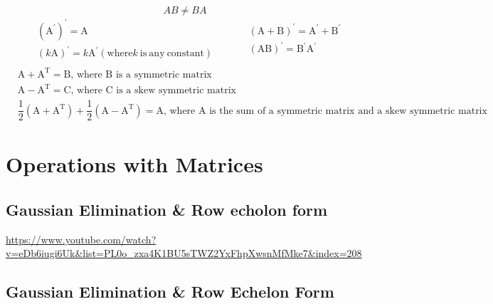 \documentclass[openany]{book}
\begin{document}
\begin{equation*}
	AB\neq BA    
\end{equation*}
\begin{equation*}
	\begin{split}
		&(\mathrm{A}^{\prime})^{\prime}=\mathrm{A}\\
		&(k\mathrm{A})^{\prime}=k\mathrm{A}^{\prime} (\mathrm{where} k\mathrm{~is~any~constant})\\
	\end{split}
	\quad \quad
	\begin{split}
		&(\mathrm{A}+\mathrm{B})^{\prime}=\mathrm{A}^{\prime}+\mathrm{B}^{\prime}\\
		&(\mathrm{A}\mathrm{B})^{\prime}=\mathrm{B}^{\prime} \mathrm{A}^{\prime}\\
	\end{split}
\end{equation*}
\begin{align*}
	 & \mathrm{A}+\mathrm{A}^\mathrm{T}=\mathrm{B}\text{, where \(\mathrm{B}\) is a symmetric matrix}                                                                                                     \\
	 & \mathrm{A}-\mathrm{A}^\mathrm{T}=\mathrm{C}\text{, where \(\mathrm{C}\) is a skew symmetric matrix}                                                                                                \\
	 & \dfrac{1}{2}(\mathrm{A}+\mathrm{A}^\mathrm{T})+\dfrac{1}{2}(\mathrm{A}-\mathrm{A}^\mathrm{T})=\mathrm{A}\text{, where \(\mathrm{A}\) is the sum of a symmetric matrix and a skew symmetric matrix}
\end{align*}

\section{Operations with Matrices}

\subsection{Gaussian Elimination \& Row echolon form}

\url{https://www.youtube.com/watch?v=eDb6iugi6Uk&list=PL0o_zxa4K1BU5sTWZ2YxFhpXwsnMfMke7&index=208}

\subsection{Gaussian Elimination \& Row Echelon Form}
\end{document}
